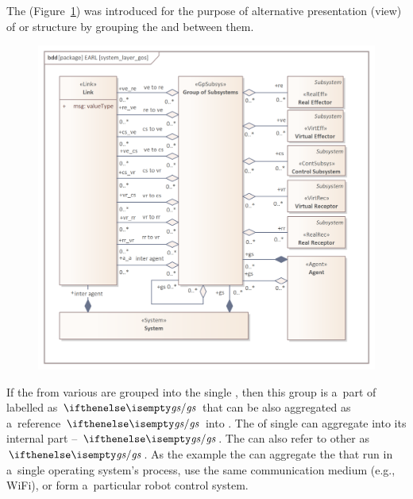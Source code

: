 \documentclass[11pt,oneside,a4paper]{article}
\newcommand{\Figure}[0]{Figure}
\begin{document}
	The \GroupofSubsystems{} (\Figure{}~\ref{fig:grupa_podsystemowa}) was introduced for the purpose of alternative presentation (view) of \System{} or \Agent{} structure by grouping the \Subsystems{} and \Links{} between them. 
		
		
\begin{figure}[H]
	\centering
	\begin{center}
		{\includegraphics[width=.8\columnwidth]{img/basic_earl_model/system_layer_gos.png}}
	\end{center}
	\caption{\GroupofSubsystems{}} 
	\label{fig:grupa_podsystemowa}
\end{figure}
		
If the \Subsystems{} from various \Agents{} are grouped into the single \GroupofSubsystems{}, then this group is a~part of \System{} labelled as $\egs{}$ that can be also aggregated as a~reference $\egs{}$ into \Agents{}. 
 The \Subsystems{} of single \Agent{} can aggregate into its internal part -- \GroupofSubsystems{} $\egs{}$.
The \GroupofSubsystems{} can also refer to other \GroupofSubsystems{} as $\egs{}$. As the example the \GroupofSubsystems{} can aggregate the \Subsystems{} that run in a~single operating system's process, use the same communication medium (e.g., WiFi), or form a~particular robot control system.
	
\end{document}
